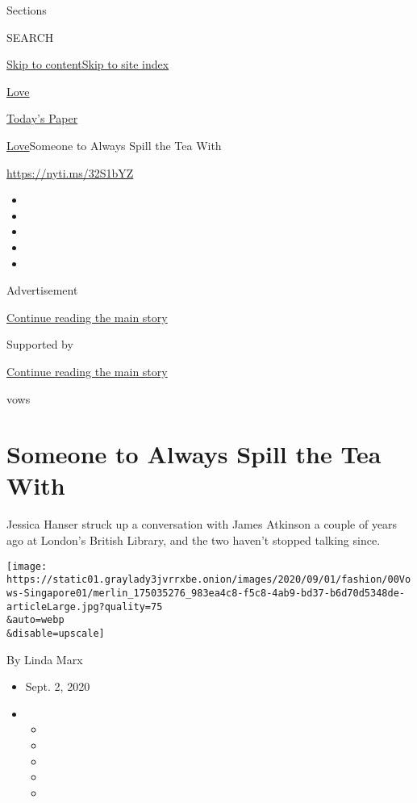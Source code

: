 Sections

SEARCH

\protect\hyperlink{site-content}{Skip to
content}\protect\hyperlink{site-index}{Skip to site index}

\href{https://www.nytimes3xbfgragh.onion/section/fashion/weddings}{Love}

\href{https://myaccount.nytimes3xbfgragh.onion/auth/login?response_type=cookie\&client_id=vi}{}

\href{https://www.nytimes3xbfgragh.onion/section/todayspaper}{Today's
Paper}

\href{/section/fashion/weddings}{Love}\textbar{}Someone to Always Spill
the Tea With

\url{https://nyti.ms/32S1bYZ}

\begin{itemize}
\item
\item
\item
\item
\item
\end{itemize}

Advertisement

\protect\hyperlink{after-top}{Continue reading the main story}

Supported by

\protect\hyperlink{after-sponsor}{Continue reading the main story}

vows

\hypertarget{someone-to-always-spill-the-tea-with}{%
\section{Someone to Always Spill the Tea
With}\label{someone-to-always-spill-the-tea-with}}

Jessica Hanser struck up a conversation with James Atkinson a couple of
years ago at London's British Library, and the two haven't stopped
talking since.

\texttt{[image: https://static01.graylady3jvrrxbe.onion/images/2020/09/01/fashion/00Vows-Singapore01/merlin\_175035276\_983ea4c8-f5c8-4ab9-bd37-b6d70d5348de-articleLarge.jpg?quality=75\\\&auto=webp\\\&disable=upscale]}

By Linda Marx

\begin{itemize}
\item
  Sept. 2, 2020
\item
  \begin{itemize}
  \item
  \item
  \item
  \item
  \item
  \end{itemize}
\end{itemize}


